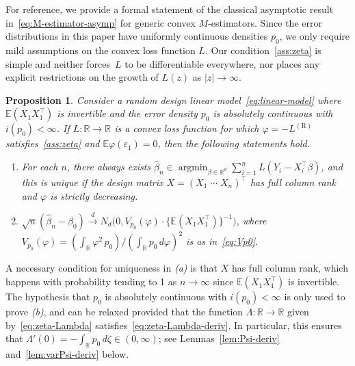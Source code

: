 \documentclass[a4paper]{article}
\newcommand{\R}{\mathbb{R}}
\newcommand{\E}{\mathbb{E}}
\newcommand{\cvd}{\overset{d}{\to}}
\DeclareMathOperator*{\argmin}{argmin}
\newtheorem{proposition}[theorem]{Proposition}
\theoremstyle{definition}
\begin{document}
For reference, we provide a formal statement of the classical asymptotic result in~\eqref{eq:M-estimator-asymp} for generic convex $M$-estimators. Since the error distributions in this paper have uniformly continuous densities $p_0$, we only require mild assumptions on the convex loss function $L$. 
Our condition~\ref{ass:zeta} is simple and neither forces~$L$ to be differentiable everywhere, nor places any explicit restrictions on the growth of $L(z)$ as $|z| \to \infty$.

\begin{proposition}
\label{prop:cvx-M-est-asymp}
Consider a random design linear model~\eqref{eq:linear-model} where $\E(X_1 X_1^\top)$ is invertible and the error density $p_0$ is absolutely continuous with $i(p_0) < \infty$. If $L \colon \R \to \R$ is a convex loss function for which $\varphi = -L^{(\mathrm{R})}$ satisfies~\emph{\ref{ass:zeta}} and $\E\varphi(\varepsilon_1) = 0$, then the following statements hold.
\begin{enumerate}[label=(\alph*)]
\item For each $n$, there always exists $\hat{\beta}_n \in \argmin_{\beta \in \R^d} \sum_{i=1}^n L(Y_i - X_i^\top\beta)$, and this is unique if the design matrix $X = (X_1 \; \cdots \; X_n)^\top$ has full column rank and $\varphi$ is strictly decreasing.
\item $\sqrt{n}(\hat{\beta}_n - \beta_0) \cvd N_d\bigl(0, V_{p_0}(\varphi) \cdot \{\E(X_1 X_1^\top)\}^{-1}\bigr)$, where $V_{p_0}(\varphi) = (\int_\R \varphi^2\,p_0)/(\int_\R p_0\,d\varphi)^2$ is as in~\eqref{eq:Vp0}.
\end{enumerate}
\end{proposition}

A necessary condition for uniqueness in \textit{(a)} is that $X$ has full column rank, which happens with probability tending to 1 as $n \to \infty$ since $\E(X_1 X_1^\top)$ is invertible. The hypothesis that $p_0$ is absolutely continuous with $i(p_0) < \infty$ is only used to prove \textit{(b)}, and can be relaxed provided that the function $\Lambda \colon \R \to \R$ given by~\eqref{eq:zeta-Lambda} satisfies~\eqref{eq:zeta-Lambda-deriv}. In particular, this ensures that $\Lambda'(0) = -\int_\R p_0\,d\zeta \in (0,\infty)$; see Lemmas~\ref{lem:Psi-deriv} and~\ref{lem:varPsi-deriv} below.
\end{document}
